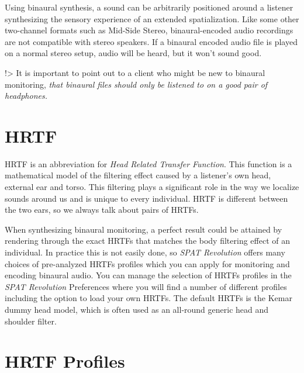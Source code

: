 \documentclass[
  letterpaper,
  DIV=11,
  numbers=noendperiod]{scrreport}
\begin{document}
Using binaural synthesis, a sound can be arbitrarily positioned around a
listener synthesizing the sensory experience of an extended
spatialization. Like some other two-channel formats such as Mid-Side
Stereo, binaural-encoded audio recordings are not compatible with stereo
speakers. If a binaural encoded audio file is played on a normal stereo
setup, audio will be heard, but it won't sound good.

!\textgreater{} It is important to point out to a client who might be
new to binaural monitoring, \emph{that binaural files should only be
listened to on a good pair of headphones.}

\hypertarget{hrtf}{%
\section{HRTF}\label{hrtf}}

HRTF is an abbreviation for \emph{Head Related Transfer Function}. This
function is a mathematical model of the filtering effect caused by a
listener's own head, external ear and torso. This filtering plays a
significant role in the way we localize sounds around us and is unique
to every individual. HRTF is different between the two ears, so we
always talk about pairs of HRTFs.

When synthesizing binaural monitoring, a perfect result could be
attained by rendering through the exact HRTFs that matches the body
filtering effect of an individual. In practice this is not easily done,
so \emph{SPAT Revolution} offers many choices of pre-analyzed HRTFs
profiles which you can apply for monitoring and encoding binaural audio.
You can manage the selection of HRTFs profiles in the \emph{SPAT
Revolution} Preferences where you will find a number of different
profiles including the option to load your own HRTFs. The default HRTFs
is the Kemar dummy head model, which is often used as an all-round
generic head and shoulder filter.

\hypertarget{hrtf-profiles}{%
\section{HRTF Profiles}\label{hrtf-profiles}}
\end{document}

